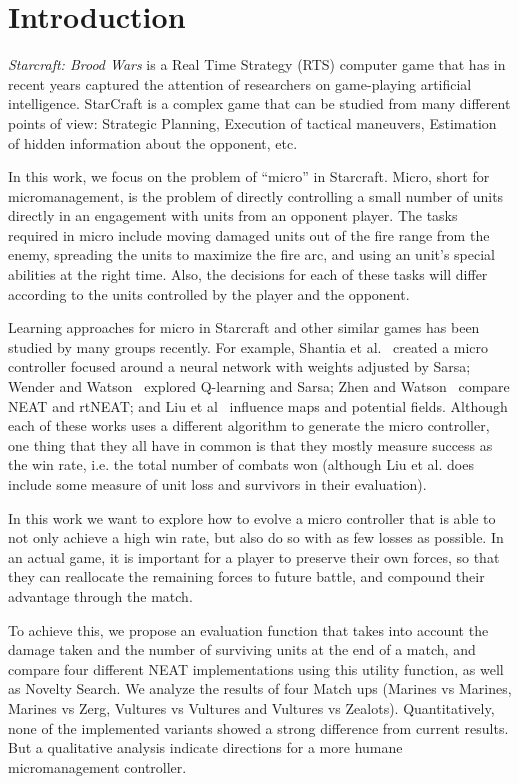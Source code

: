 \section{Introduction}\label{section:introduction}

\emph{Starcraft: Brood Wars} is a Real Time Strategy (RTS) computer
game that has in recent years captured the attention of researchers on
game-playing artificial intelligence. StarCraft is a complex game that
can be studied from many different points of view: Strategic Planning,
Execution of tactical maneuvers, Estimation of hidden information
about the opponent, etc.

In this work, we focus on the problem of ``micro'' in
Starcraft. Micro, short for micromanagement, is the problem of
directly controlling a small number of units directly in an engagement
with units from an opponent player. The tasks required in micro
include moving damaged units out of the fire range from the enemy,
spreading the units to maximize the fire arc, and using an unit's
special abilities at the right time. Also, the decisions for each of
these tasks will differ according to the units controlled by the
player and the opponent.

Learning approaches for micro in Starcraft and other similar games has
been studied by many groups recently. For example, Shantia et
al.~\cite{ShBeWi11} created a micro controller focused around a neural
network with weights adjusted by Sarsa; Wender and
Watson~\cite{WeWa12} explored Q-learning and Sarsa; Zhen and
Watson~\cite{ShWa13} compare NEAT and rtNEAT; and Liu et
al~\cite{SiSuBa14} influence maps and potential fields.  Although each
of these works uses a different algorithm to generate the micro
controller, one thing that they all have in common is that they mostly
measure success as the win rate, i.e. the total number of combats won
(although Liu et al. does include some measure of unit loss and
survivors in their evaluation).

In this work we want to explore how to evolve a micro controller that
is able to not only achieve a high win rate, but also do so with as
few losses as possible. In an actual game, it is important for a player
to preserve their own forces, so that they can reallocate the remaining
forces to future battle, and compound their advantage through the match.

To achieve this, we propose an evaluation function that takes into
account the damage taken and the number of surviving units at the end
of a match, and compare four different NEAT implementations using this
utility function, as well as Novelty Search. We analyze the results of
four Match ups (Marines vs Marines, Marines vs Zerg, Vultures vs
Vultures and Vultures vs Zealots). Quantitatively, none of the
implemented variants showed a strong difference from current
results. But a qualitative analysis indicate directions for a more
humane micromanagement controller.
